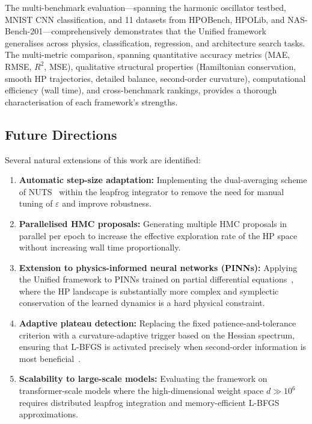\documentclass[12pt,a4paper]{article}
\begin{document}
The multi-benchmark evaluation---spanning the harmonic oscillator
testbed, MNIST CNN classification, and 11 datasets from HPOBench,
HPOLib, and NAS-Bench-201---comprehensively demonstrates that the
Unified framework generalises across physics, classification, regression,
and architecture search tasks.  The multi-metric comparison, spanning
quantitative accuracy metrics (MAE, RMSE, $R^2$, MSE), qualitative
structural properties (Hamiltonian conservation, smooth HP trajectories,
detailed balance, second-order curvature), computational efficiency
(wall time), and cross-benchmark rankings, provides a thorough
characterisation of each framework's strengths.

\subsection*{Future Directions}

Several natural extensions of this work are identified:

\begin{enumerate}[leftmargin=*, label=\arabic*.]
\item \textbf{Automatic step-size adaptation:}  Implementing the
      dual-averaging scheme of NUTS~\cite{betancourt2017} within
      the leapfrog integrator to remove the need for manual tuning
      of $\varepsilon$ and improve robustness.

\item \textbf{Parallelised HMC proposals:}  Generating multiple
      HMC proposals in parallel per epoch to increase the effective
      exploration rate of the HP space without increasing wall time
      proportionally.

\item \textbf{Extension to physics-informed neural networks
      (PINNs):}  Applying the Unified framework to PINNs trained on
      partial differential equations~\cite{krishnapriyan2021,wang2023,kiyani2025},
      where the HP landscape is substantially more complex and
      symplectic conservation of the learned dynamics is a hard
      physical constraint.

\item \textbf{Adaptive plateau detection:}  Replacing the fixed
      patience-and-tolerance criterion with a curvature-adaptive
      trigger based on the Hessian spectrum, ensuring that L-BFGS
      is activated precisely when second-order information is most
      beneficial~\cite{rathore2024}.

\item \textbf{Scalability to large-scale models:}  Evaluating the
      framework on transformer-scale models where the high-dimensional
      weight space $d \gg 10^6$ requires distributed leapfrog
      integration and memory-efficient L-BFGS approximations.
\end{enumerate}
\end{document}
